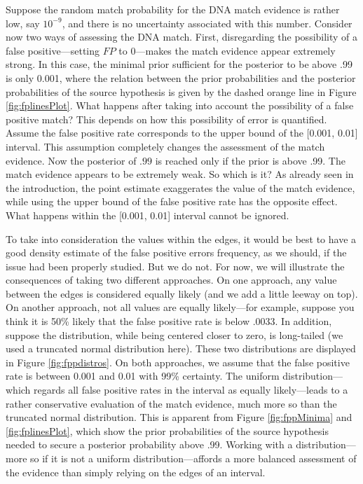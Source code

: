 \documentclass[
  10pt,
  dvipsnames,enabledeprecatedfontcommands]{scrartcl}
\begin{document}
Suppose the random match probability for the DNA match evidence is
rather low, say \(10^{-9}\), and there is no uncertainty associated with
this number. Consider now two ways of assessing the DNA match. First,
disregarding the possibility of a false positive---setting \(FP\) to
\(0\)---makes the match evidence appear extremely strong. In this case,
the minimal prior sufficient for the posterior to be above .99 is only
0.001, where the relation between the prior probabilities and the
posterior probabilities of the source hypothesis is given by the dashed
orange line in Figure \ref{fig:fplinesPlot}. What happens after taking
into account the possibility of a false positive match? This depends on
how this possibility of error is quantified. Assume the false positive
rate corresponds to the upper bound of the {[}0.001, 0.01{]} interval.
This assumption completely changes the assessment of the match evidence.
Now the posterior of \(.99\) is reached only if the prior is above .99.
The match evidence appears to be extremely weak. So which is it? As
already seen in the introduction, the point estimate exaggerates the
value of the match evidence, while using the upper bound of the false
positive rate has the opposite effect. What happens within the {[}0.001,
0.01{]} interval cannot be ignored.

To take into consideration the values within the edges, it would be best
to have a good density estimate of the false positive errors frequency,
as we should, if the issue had been properly studied. But we do not. For
now, we will illustrate the consequences of taking two different
approaches. On one approach, any value between the edges is considered
equally likely (and we add a little leeway on top). On another approach,
not all values are equally likely---for example, suppose you think it is
50\% likely that the false positive rate is below .0033. In addition,
suppose the distribution, while being centered closer to zero, is
long-tailed (we used a truncated normal distribution here). These two
distributions are displayed in Figure \ref{fig:fppdistros}. On both
approaches, we assume that the false positive rate is between 0.001 and
0.01 with 99\% certainty. The uniform distribution---which regards all
false positive rates in the interval as equally likely---leads to a
rather conservative evaluation of the match evidence, much more so than
the truncated normal distribution. This is apparent from Figure
\ref{fig:fppMinima} and \ref{fig:fplinesPlot}, which show the prior
probabilities of the source hypothesis needed to secure a posterior
probability above .99. Working with a distribution---more so if it is
not a uniform distribution---affords a more balanced assessment of the
evidence than simply relying on the edges of an interval.
\end{document}

